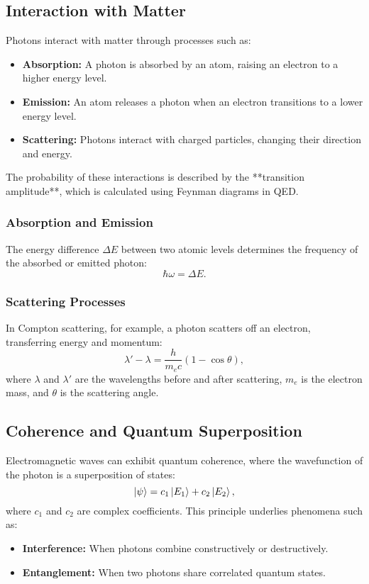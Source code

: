 \subsection{Interaction with Matter}
Photons interact with matter through processes such as:
\begin{itemize}
    \item \textbf{Absorption:} A photon is absorbed by an atom, raising an electron to a higher energy level.
    \item \textbf{Emission:} An atom releases a photon when an electron transitions to a lower energy level.
    \item \textbf{Scattering:} Photons interact with charged particles, changing their direction and energy.
\end{itemize}

The probability of these interactions is described by the **transition amplitude**, which is calculated using Feynman diagrams in QED.

\subsubsection{Absorption and Emission}
The energy difference $\Delta E$ between two atomic levels determines the frequency of the absorbed or emitted photon:
\[
\hbar \omega = \Delta E.
\]

\subsubsection{Scattering Processes}
In Compton scattering, for example, a photon scatters off an electron, transferring energy and momentum:
\[
\lambda' - \lambda = \frac{h}{m_e c} (1 - \cos \theta),
\]
where $\lambda$ and $\lambda'$ are the wavelengths before and after scattering, $m_e$ is the electron mass, and $\theta$ is the scattering angle.

\subsection{Coherence and Quantum Superposition}
Electromagnetic waves can exhibit quantum coherence, where the wavefunction of the photon is a superposition of states:
\[
\ket{\psi} = c_1 \ket{E_1} + c_2 \ket{E_2},
\]
where $c_1$ and $c_2$ are complex coefficients. This principle underlies phenomena such as:
\begin{itemize}
    \item \textbf{Interference:} When photons combine constructively or destructively.
    \item \textbf{Entanglement:} When two photons share correlated quantum states.
\end{itemize}

